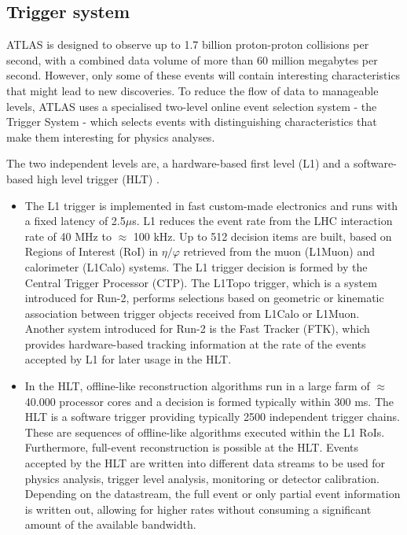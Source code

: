 \documentclass[a4paper, oneside]{book}
\begin{document}
				\subsection{Trigger system}
					\cite{Trigger intro}ATLAS is designed to observe up to 1.7 billion proton-proton collisions per second, with a combined data volume of more than 60 million megabytes per second. However, only some of these events will contain interesting characteristics that might lead to new discoveries. To reduce the flow of data to manageable levels, ATLAS uses a specialised two-level online event selection system - the Trigger System - which selects events with distinguishing characteristics that make them interesting for physics analyses.
				
					The two independent levels are, a hardware-based first level (L1) and a software-based high level trigger (HLT) \cite{Trigger system}. 
					\begin{itemize}
						\item The L1 trigger is implemented in fast custom-made electronics and runs with a fixed latency of 2.5$\mu$s. L1 reduces the event rate from the LHC interaction rate of 40 MHz to $\approx$ 100 kHz. Up to 512 decision items are built, based on Regions of Interest (RoI) in $\eta/\varphi$ retrieved from the muon (L1Muon) and calorimeter (L1Calo) systems. The L1 trigger decision is formed by the Central Trigger Processor (CTP). The L1Topo trigger, which is a system introduced for Run-2, performs selections based on geometric or kinematic association between trigger objects received from L1Calo or L1Muon. Another system introduced for Run-2 is the Fast Tracker (FTK), which provides hardware-based tracking information at the rate of the events accepted by L1 for later usage in the HLT.
						
						\item In the HLT, offline-like reconstruction algorithms run in a large farm of $\approx$ 40.000 processor cores and a decision is formed typically within 300 ms. The HLT is a software trigger providing typically 2500 independent trigger chains. These are sequences of offline-like algorithms executed within the L1 RoIs. Furthermore, full-event reconstruction is possible at the HLT. Events accepted by the HLT are written into different data streams to be used for physics analysis, trigger level analysis, monitoring or detector calibration. Depending on the datastream, the full event or only partial event information is written out, allowing for higher rates without consuming a significant amount of the available bandwidth.
					\end{itemize}
					
\end{document}
